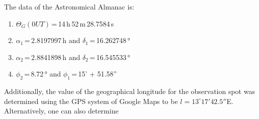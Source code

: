The data of the Astronomical Almanac is: 

\begin{enumerate}
    \item $\Theta_G(0UT)$\,=\,14\,h\,52\,m\,28.7584\,s
    \item $\alpha_1$\,=\,2.8197997\,h and $\delta_1$\,=\,16.262748\,°
    \item $\alpha_2$\,=\,2.8841898\,h and $\delta_2$\,=\,16.545533\,°
    \item $\phi_2$\,=\,8.72\,° and $\phi_1$\,=\,15' + 51.58''
\end{enumerate}

Additionally, the value of the geographical longitude for the observation spot was determined using the GPS system of Google Maps to be $l=13^\circ 17' 42.5''$E.
Alternatively, one can also determine 

%
%
